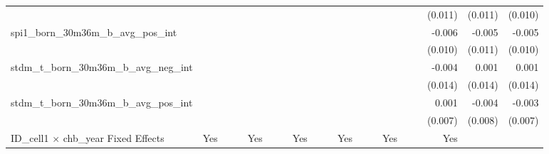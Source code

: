 \begin{tabular}{lrrrrrrrrrrrrrrrrrr}
                                            &              &              &              &              &              &              &              &              &               &              &              &               &              &              &               &      (0.011) &      (0.011) &       (0.010) \\ 
spi1\_born\_30m36m\_b\_avg\_pos\_int        &              &              &              &              &              &              &              &              &               &              &              &               &              &              &               &       -0.006 &       -0.005 &        -0.005 \\ 
                                            &              &              &              &              &              &              &              &              &               &              &              &               &              &              &               &      (0.010) &      (0.011) &       (0.010) \\ 
stdm\_t\_born\_30m36m\_b\_avg\_neg\_int     &              &              &              &              &              &              &              &              &               &              &              &               &              &              &               &       -0.004 &        0.001 &         0.001 \\ 
                                            &              &              &              &              &              &              &              &              &               &              &              &               &              &              &               &      (0.014) &      (0.014) &       (0.014) \\ 
stdm\_t\_born\_30m36m\_b\_avg\_pos\_int     &              &              &              &              &              &              &              &              &               &              &              &               &              &              &               &        0.001 &       -0.004 &        -0.003 \\ 
                                            &              &              &              &              &              &              &              &              &               &              &              &               &              &              &               &      (0.007) &      (0.008) &       (0.007) \\ 
\midrule
ID\_cell1 $\times$ chb\_year Fixed Effects  &          Yes &              &              &          Yes &              &              &          Yes &              &               &          Yes &              &               &          Yes &              &               &          Yes &              &               \\ 

\end{tabular}
